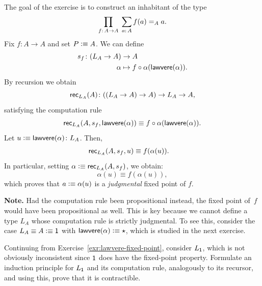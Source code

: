 \begin{solution}
    The goal of the exercise is to construct an inhabitant of the type
    \[
        \prod_{f\colon A\to A}\;
        \sum_{a\colon A}
            f(a)\eq Aa.
    \]
    Fix $f\colon A\to A$ and set $P\mathrel{\vcentcolon}\equiv A$. We can define
    \begin{align*}
        s_f\colon(L_A\to A)&\to A\\
        \alpha&\mapsto f\circ\alpha(\fun{lawvere}(\alpha)).
    \end{align*}
    By recursion we obtain
    \[
        \fun{rec}_{L_A}(A)\colon((L_A\to A)\to A)
        \to L_A\to A,
    \]
    satisfying the computation rule
    \[
        \mathsf{rec}_{L_A}(
                A,
                s_f,
                \mathsf{lawvere}(\alpha)
            )
            \equiv f\circ\alpha(\mathsf{lawvere}(\alpha)).
    \]
    Let $u\defeq\fun{lawvere}(\alpha)\colon L_A$. Then,
    \begin{align*}
        \mathsf{rec}_{L_A}(A,s_f,u)
            &\equiv f(\alpha(u)).
    \end{align*}
    In particular, setting $\alpha\mathrel{\vcentcolon}\equiv\mathsf{rec}_{L_A}(A,s_f)$, we obtain:
    \[
        \alpha(u)\equiv f(\alpha(u)),
    \]
    which proves that $a\mathrel{\vcentcolon}\equiv\alpha(u)$ is a \textit{judgmental} fixed point of $f$.

    {\small
    \textbf{Note.} Had the computation rule been propositional instead, the fixed point of~$f$ would have been propositional as well. This is key because we cannot define a type $L_A$ whose computation rule is strictly judgmental. To see this, consider the case $L_A\equiv A\mathrel{\vcentcolon}\equiv\mathsf{1}$ with $\mathsf{lawvere}(\alpha)\mathrel{\vcentcolon}\equiv\star$, which is studied in the next exercise.}

\end{solution}

\begin{exr}
    Continuing from\/ {\upshape Exercise~\ref{exr:lawvere-fixed-point}}, consider\/ $L_{\mathsf{1}}$, which is not obviously inconsistent since\/ $\mathsf{1}$ does have the fixed-point property. Formulate an induction principle for\/ $L_{\mathsf{1}}$ and its computation rule, analogously to its recursor, and using this, prove that it is contractible.
\end{exr}

